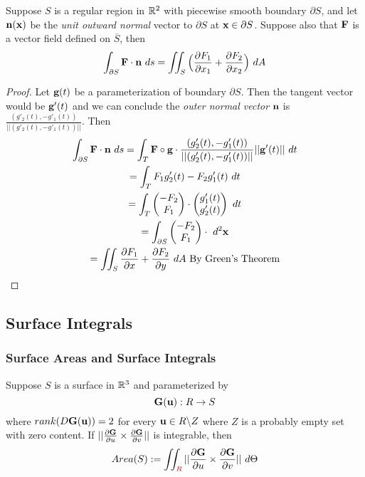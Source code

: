 \documentclass[11pt]{article}
\begin{document}
				\begin{corollary}
					Suppose $S$ is a regular region in $\mathbb{R}^2$ with piecewise smooth boundary $\partial S$, and let $\textbf{n}(\textbf{x})$ be the \emph{unit outward normal} vector to $\partial S$ at $\textbf{x} \in \partial S$. Suppose also that $\textbf{F}$ is a vector field defined on $\overline{S}$, then
					\begin{equation}
						\int_{\partial S} \ve{F} \cdot \ve{n}\ ds = \iint_S \Big(\pd{F_1}{x_1}  + \pd{F_2}{x_2}\Big)\ dA
					\end{equation}
						\begin{proof}
							Let $\textbf{g}(t)$ be a parameterization of boundary $\partial S$. Then the tangent vector would be $\textbf{g}'(t)$ and we can conclude the \emph{outer normal vector} $\textbf{n}$ is $\frac{(g'_2(t), -g'_1(t))}{||(g'_2(t), - g'_1(t))||}$. Then 
							\begin{gather}
								\int_{\partial S}\ve{F} \cdot \ve{n}\ ds = \int_{T}\ve{F}\circ \ve{g} \cdot \frac{(g'_2(t), -g'_1(t))}{||(g'_2(t), -g'_1(t))||} ||\ve{g}'(t)||\ dt \\
								=  \int_T F_1 g'_2(t) - F_2 g'_1(t)\ dt \\
								= \int_T \begin{pmatrix}-F_2 \\F_1 \end{pmatrix} \cdot \begin{pmatrix} g'_1(t) \\ g'_2(t) \end{pmatrix}\ dt \\
								= \int_{\partial S} \begin{pmatrix}-F_2 \\F_1 \end{pmatrix} \cdot\ d^2\ve{x} \\
								= \iint_{S} \pd{F_1}{x} + \pd{F_2}{y}\ dA \tx{ By Green's Theorem}
							\end{gather}
						\end{proof}
				\end{corollary}
		\subsection{Surface Integrals}
			\subsubsection{Surface Areas and Surface Integrals}
				\begin{definition}
					Suppose $S$ is a surface in $\mathbb{R}^3$ and parameterized by
					\begin{equation}
						\textbf{G}(\textbf{u}): R \to S
					\end{equation}
					where $rank(D\textbf{G}(\textbf{u}))=2$ for every $\textbf{u} \in R \backslash Z$ where $Z$ is a probably empty set with zero content. If $\vert \vert {\frac{\partial{\textbf{G}}}{\partial{u}} \times \frac{\partial{\textbf{G}}}{\partial{v}}} \vert \vert$ is integrable, then
					\begin{equation}
						Area(S) := \iint_{\red{R}} \norm{\pd{\ve{G}}{u} \times \pd{\ve{G}}{v}}\ d\Theta
					\end{equation}
				\end{definition}
				
\end{document}
